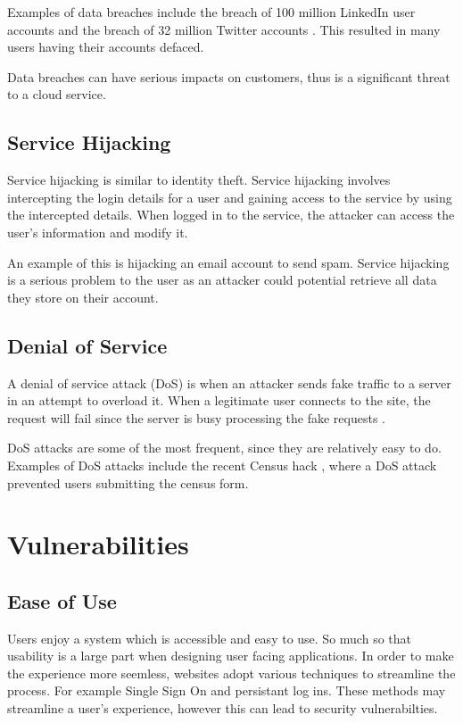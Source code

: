 Examples of data breaches include the breach of 100 million LinkedIn user accounts \cite{linkedin_update_2012} and the breach of 32 million Twitter accounts \cite{leakedsource_leakedsource_2016}. This resulted in many users having their accounts defaced.

Data breaches can have serious impacts on customers, thus is a significant threat to a cloud service.

\subsection{Service Hijacking}

Service hijacking is similar to identity theft. Service hijacking involves intercepting the login details for a user and gaining access to the service by using the intercepted details. When logged in to the service, the attacker can access the user's information and modify it.

An example of this is hijacking an email account to send spam. Service hijacking is a serious problem to the user as an attacker could potential retrieve all data they store on their account.

\subsection{Denial of Service}

A denial of service attack (DoS) is when an attacker sends fake traffic to a server in an attempt to overload it. When a legitimate user connects to the site, the request will fail since the server is busy processing the fake requests \cite{department_of_homeland_security_understanding_2009}.

DoS attacks are some of the most frequent, since they are relatively easy to do. Examples of DoS attacks include the recent Census hack \cite{abc_abs_2016}, where a DoS attack prevented users submitting the census form.


\section{Vulnerabilities}

\subsection{Ease of Use}

Users enjoy a system which is accessible and easy to use. So much so that usability is a large part when designing user facing applications. 
In order to make the experience more seemless, websites adopt various techniques to streamline the process. For example Single Sign On and persistant log ins. These methods may streamline a user's experience, however this can lead to security vulnerabilties\cite{javaid_secure_2013}.


